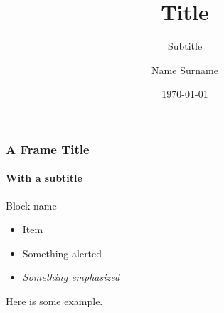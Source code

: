 \documentclass[10pt]{beamer}
\title{Title}
\subtitle{Subtitle}
\author[N. Surname]{Name Surname}
\institute[ShortConf]{Conference Name}
\date[\today]{\today}
\begin{document}
\begin{frame}[plain]
	\titlepage
\end{frame}

\begin{frame}
	\frametitle{A Frame Title}
	\framesubtitle{With a subtitle}
	\begin{block}{Block name}
	\begin{itemize}
		\item Item
		\item \alert{Something alerted}
		\item \emph{Something emphasized}
	\end{itemize}
	\end{block}
	\begin{example}
		Here is some example.
	\end{example}
\end{frame}
\end{document}
